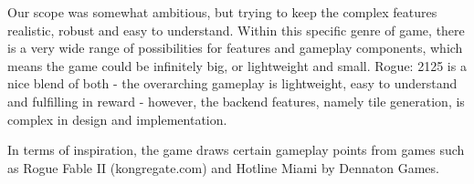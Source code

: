\documentclass[12pt]{article}
\begin{document}
Our scope was somewhat ambitious, but trying to keep the complex features realistic, robust and easy to understand. Within this specific genre of game, there is a very wide range of possibilities for features and gameplay components, which means the game could be infinitely big, or lightweight and small. Rogue: 2125 is a nice blend of both - the overarching gameplay is lightweight, easy to understand and fulfilling in reward - however, the backend features, namely tile generation, is complex in design and implementation. \linebreak

In terms of inspiration, the game draws certain gameplay points from games such as Rogue Fable II (kongregate.com) and Hotline Miami by Dennaton Games.
\end{document}
